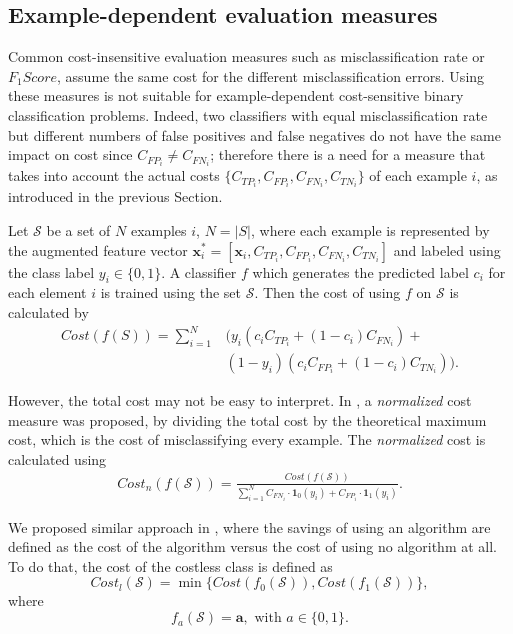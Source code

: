 \subsection{Example-dependent evaluation measures}
\label{sec:2:csmeasures}

  Common cost-insensitive evaluation measures such as misclassification rate or \mbox{$F_1Score$}, 
  assume the same cost for the different misclassification errors. Using these measures is not 
  suitable for example-dependent cost-sensitive binary classification problems. Indeed, two 
  classifiers with equal misclassification rate but different numbers of false positives and 
  false negatives do not have the same impact on cost since \mbox{$C_{FP_i}\ne C_{FN_i}$};
  therefore there is a need for a measure that takes into account the actual costs 
  $\{C_{TP_i},C_{FP_i},C_{FN_i},C_{TN_i}\}$ of each example $i$, as introduced in the previous 
  Section.
  \label{ntn:ch2:3}

  Let $\mathcal{S}$ be a set of $N$ examples $i$, $N=\vert S \vert$, where each example is 
  represented by  the augmented feature vector $\mathbf{x}_i^*=[\mathbf{x}_i, 
  C_{TP_i},C_{FP_i},C_{FN_i},C_{TN_i}]$  and labeled using the class   label $y_i   \in \{0,1\}$. 
  A classifier $f$ which generates the   predicted label $c_i$ for each   element $i$ is trained  
  using the set $\mathcal{S}$. Then the cost of   using $f$ on $\mathcal{S}$ is calculated by
  \begin{align}\label{eq:cost}
    Cost(f(S)) = \sum_{i=1}^{N} & {\bigg( y_i(c_i C_{TP_i} + (1-c_i)C_{FN_i})} + \\
    & {(1-y_i)(c_i C_{FP_i} + (1-c_i)C_{TN_i}) \bigg)}.
  \end{align}

  However, the total cost may not be easy to interpret. In \citep{Whitrow2008}, a 
  \textit{normalized} cost measure was proposed, by dividing the total cost by the theoretical 
  maximum cost, which is the cost of misclassifying every example. The \textit{normalized} cost is 
  calculated using
  \begin{align}\label{eq:ncost}
    Cost_n(f(\mathcal{S})) = \frac{Cost(f(\mathcal{S}))}
    {\sum_{i=1}^N C_{FN_i} \cdot \mathbf{1}_0(y_i) 
    +  C_{FP_i} \cdot \mathbf{1}_1(y_i)  }.
  \end{align} 

  We proposed similar approach in \citep{CorreaBahnsen2014b}, where the savings of using an 
  algorithm  are defined as the cost of the algorithm versus the cost of using no algorithm at all. 
  To do that, the cost of the costless class is defined as 
  \begin{equation}
    Cost_l(\mathcal{S}) = \min \{Cost(f_0(\mathcal{S})), Cost(f_1(\mathcal{S}))\},
  \end{equation}
  where 
  \begin{equation}\label{eq:f_a}
    f_a(\mathcal{S}) = \mathbf{a}, \text{ with } a\in \{0,1\}.
  \end{equation}

